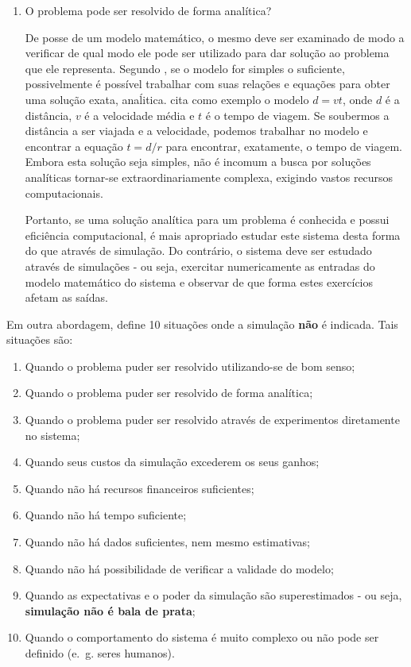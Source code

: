 \begin{enumerate}
\item O problema pode ser resolvido de forma analítica?

De posse de um modelo matemático, o mesmo deve ser examinado de modo a verificar
de qual modo ele pode ser utilizado para dar solução ao problema que ele
representa. Segundo \cite{Law}, se o modelo for simples o suficiente,
possivelmente é possível trabalhar com suas relações e equações para obter uma
solução exata, anaĺitica. \cite{Law} cita como exemplo o modelo $d = vt$, onde
$d$ é a distância, $v$ é a velocidade média e $t$ é o tempo de viagem. Se
soubermos a distância a ser viajada e a velocidade, podemos trabalhar no modelo
e encontrar a equação $t = d/r$ para encontrar, exatamente, o tempo de viagem.
Embora esta solução seja simples, não é incomum a busca por soluções analíticas
tornar-se extraordinariamente complexa, exigindo vastos recursos computacionais.

Portanto, se uma solução analítica para um problema é conhecida e possui
eficiência computacional, é mais apropriado estudar este sistema desta forma do
que através de simulação. Do contrário, o sistema deve ser estudado através de
simulações - ou seja, exercitar numericamente as entradas do modelo matemático
do sistema e observar de que forma estes exercícios afetam as saídas.
\end{enumerate}

Em outra abordagem, \cite{BanksGibson} define 10 situações onde a simulação
\textbf{não} é indicada. Tais situações são:

\begin{enumerate}
\item Quando o problema puder ser resolvido utilizando-se de bom senso;
\item Quando o problema puder ser resolvido de forma analítica;
\item Quando o problema puder ser resolvido através de experimentos diretamente
      no sistema;
\item Quando seus custos da simulação excederem os seus ganhos;
\item Quando não há recursos financeiros suficientes;
\item Quando não há tempo suficiente;
\item Quando não há dados suficientes, nem mesmo estimativas;
\item Quando não há possibilidade de verificar a validade do modelo;
\item Quando as expectativas e o poder da simulação são superestimados - ou
      seja, \textbf{simulação não é bala de prata};
\item Quando o comportamento do sistema é muito complexo ou não pode ser
      definido (e.~g. seres humanos).
\end{enumerate}

